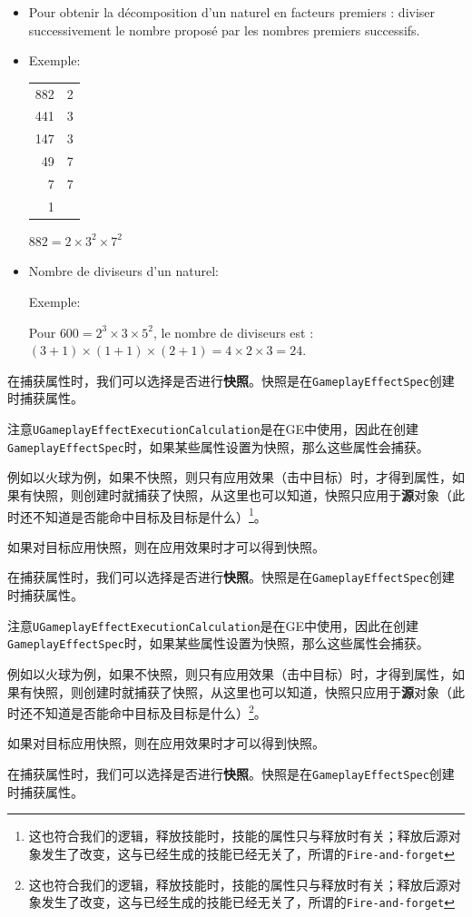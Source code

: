 \documentclass[10pt,a4paper,x11names,dvipsnames,svgnames,oneside]{ctexbook}
\begin{document}
	\begin{pr}
	\begin{itemize}
		\item Pour obtenir la décomposition d'un naturel en facteurs premiers : diviser successivement le nombre proposé par les nombres premiers successifs. 
		\item Exemple:
		\begin{center}
			\begin{tabular}{r|l}
				882&2\\
				441&3\\
				147&3\\
				49&7\\
				7&7\\
				1&\\
			\end{tabular}
			\qquad\qquad $882 = 2 \times 3^2 \times 7^2$ 
		\end{center}
		\item Nombre de diviseurs d'un naturel:
		
		Exemple:  
		
		Pour $600=2^3\times 3\times 5^2$, le nombre de diviseurs est :
		$(3+1)\times (1+1)\times (2+1)=4\times 2\times 3 = 24$.
	\end{itemize}
	在捕获属性时，我们可以选择是否进行\textbf{快照}。快照是在\texttt{GameplayEffectSpec}创建时捕获属性。
	
	注意\texttt{UGameplayEffectExecutionCalculation}是在GE中使用，因此在创建\texttt{GameplayEffectSpec}时，如果某些属性设置为快照，那么这些属性会捕获。
	
	例如以火球为例，如果不快照，则只有应用效果（击中目标）时，才得到属性，如果有快照，则创建时就捕获了快照，从这里也可以知道，快照只应用于\textbf{源}对象（此时还不知道是否能命中目标及目标是什么）\footnote{这也符合我们的逻辑，释放技能时，技能的属性只与释放时有关；释放后源对象发生了改变，这与已经生成的技能已经无关了，所谓的\texttt{Fire-and-forget}}。
	
	如果对目标应用快照，则在应用效果时才可以得到快照。
	
	在捕获属性时，我们可以选择是否进行\textbf{快照}。快照是在\texttt{GameplayEffectSpec}创建时捕获属性。
	
	注意\texttt{UGameplayEffectExecutionCalculation}是在GE中使用，因此在创建\texttt{GameplayEffectSpec}时，如果某些属性设置为快照，那么这些属性会捕获。
	
	例如以火球为例，如果不快照，则只有应用效果（击中目标）时，才得到属性，如果有快照，则创建时就捕获了快照，从这里也可以知道，快照只应用于\textbf{源}对象（此时还不知道是否能命中目标及目标是什么）\footnote{这也符合我们的逻辑，释放技能时，技能的属性只与释放时有关；释放后源对象发生了改变，这与已经生成的技能已经无关了，所谓的\texttt{Fire-and-forget}}。
	
	如果对目标应用快照，则在应用效果时才可以得到快照。
\end{pr}
在捕获属性时，我们可以选择是否进行\textbf{快照}。快照是在\texttt{GameplayEffectSpec}创建时捕获属性。
\end{document}
